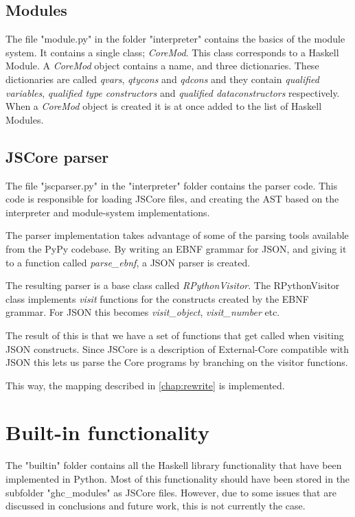 \subsection*{Modules}

The file "module.py" in the folder "interpreter" contains the basics of the
module system. It contains a single class; \emph{CoreMod}. This class corresponds
to a Haskell Module. A \emph{CoreMod} object contains a name, and three dictionaries.
These dictionaries are called \emph{qvars}, \emph{qtycons} and \emph{qdcons} and they
contain \emph{qualified variables}, \emph{qualified type constructors} and 
\emph{qualified dataconstructors} respectively. When a \emph{CoreMod} object is created
it is at once added to the list of Haskell Modules.

\subsection*{JSCore parser}

The file "jscparser.py" in the "interpreter" folder contains the parser code. 
This code is responsible for loading JSCore files, and creating the AST based 
on the interpreter and module-system implementations.

The parser implementation takes advantage of some of the parsing tools 
available from
the PyPy codebase. By writing an EBNF grammar for JSON, and giving it to a 
function called \emph{parse\_ebnf}, a JSON parser is created.

The resulting parser is a base class called \emph{RPythonVisitor}. The 
RPythonVisitor
class implements \emph{visit} functions for the constructs created by the 
EBNF grammar. For JSON this becomes \emph{visit\_object}, 
\emph{visit\_number} etc.

The result of this is that we have a set of functions that get called when 
visiting JSON constructs. Since JSCore is a description of External-Core 
compatible with JSON this lets us parse the Core programs by branching 
on the visitor functions.

This way, the mapping described in \ref{chap:rewrite} is implemented.

\section{Built-in functionality}

The "builtin" folder contains all the Haskell library functionality that
have been implemented in Python. Most of this functionality should have been
stored in the subfolder "ghc\_modules" as JSCore files. However, due to some 
issues that are discussed in conclusions and future work, this is not currently
the case.

